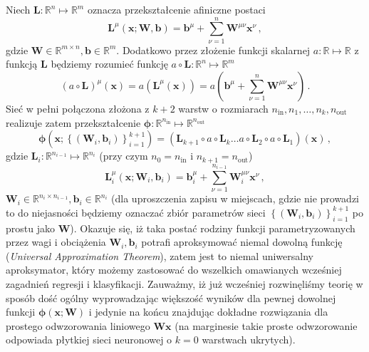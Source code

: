 \documentclass{myclass}
\numberwithin{equation}{subsection}
\begin{document}
Niech \(\bm{L}: \mathbb{R}^{n} \mapsto \mathbb{R}^{m}\) oznacza przekształcenie afiniczne postaci
\[
\bm{L}^\mu(\bm{x}; \bm{W}, \bm{b}) = \bm{b}^\mu + \sum_{\nu=1}^{n} \bm{W}^{\mu\nu}\bm{x}^\nu\,,
\]
gdzie \(\bm{W} \in \mathbb{R}^{m \times n}, \bm{b} \in \mathbb{R}^m\). Dodatkowo przez złożenie
funkcji skalarnej \(a: \mathbb{R} \mapsto \mathbb{R}\) z funkcją \(\bm{L}\) będziemy rozumieć
funkcję \(a \circ \bm{L} : \mathbb{R}^n \mapsto \mathbb{R}^m\)
\[
(a \circ \bm{L})^\mu (\bm{x}) = a\left(\bm{L}^\mu(\bm{x})\right) = a\left(\bm{b}^\mu + \sum_{\nu=1}^{n} \bm{W}^{\mu\nu}\bm{x}^\nu\right)\,.
\]
Sieć w pełni połączona złożona z \(k+2\) warstw o rozmiarach \(n_\text{in}, n_1, \ldots, n_k,
n_\text{out}\) realizuje zatem przekształcenie \(\bm{\phi}: \mathbb{R}^{n_\text{in}} \mapsto
\mathbb{R}^{n_\text{out}}\)
\[
\boxed
{
\bm{\phi}\left(\bm{x}; \left\{(\bm{W}_i, \bm{b}_i)\right\}_{i=1}^{k+1}\right) = \left( \bm{L}_{k+1} \circ a \circ \bm{L}_k \ldots a \circ \bm{L}_2 \circ a \circ \bm{L}_1 \right) (\bm{x}) \,,
}
\]
gdzie \(\bm{L}_i : \mathbb{R}^{n_{i-1}} \mapsto \mathbb{R}^{n_i}\) (przy czym \(n_0 = n_\text{in}\)
i \(n_{k+1} = n_\text{out}\))
\[
\boxed
{
\bm{L}_i^\mu \left(\bm{x}; \bm{W}_i, \bm{b}_i\right) = \bm{b}_i^\mu + \sum_{\nu=1}^{n_{i-1}} \bm{W}_i^{\mu\nu}\bm{x}^\nu\,,
}
\]
\(\bm{W}_i \in \mathbb{R}^{n_i \times n_{i-1}}, \bm{b}_i \in \mathbb{R}^{n_i}\) (dla uproszczenia
zapisu w miejscach, gdzie nie prowadzi to do niejasności będziemy oznaczać zbiór parametrów sieci
\(\left\{(\bm{W}_i, \bm{b}_i)\right\}_{i=1}^{k+1}\) po prostu jako \(\bm{W}\)). Okazuje się, iż taka
postać rodziny funkcji parametryzowanych przez wagi i obciążenia \(\bm{W}_i, \bm{b}_i\) potrafi
aproksymować niemal dowolną funkcję (\textit{Universal Approximation Theorem}), zatem jest to niemal
uniwersalny aproksymator, który możemy zastosować do wszelkich omawianych wcześniej zagadnień
regresji i klasyfikacji. Zauważmy, iż już wcześniej rozwinęliśmy teorię w sposób dość ogólny
wyprowadzając większość wyników dla pewnej dowolnej funkcji \(\bm{\phi}(\bm{x}; \bm{W})\) i jedynie
na końcu znajdując dokładne rozwiązania dla prostego odwzorowania liniowego \(\bm{W}\bm{x}\) (na
marginesie takie proste odwzorowanie odpowiada płytkiej sieci neuronowej o \(k=0\) warstwach
ukrytych).
\end{document}
